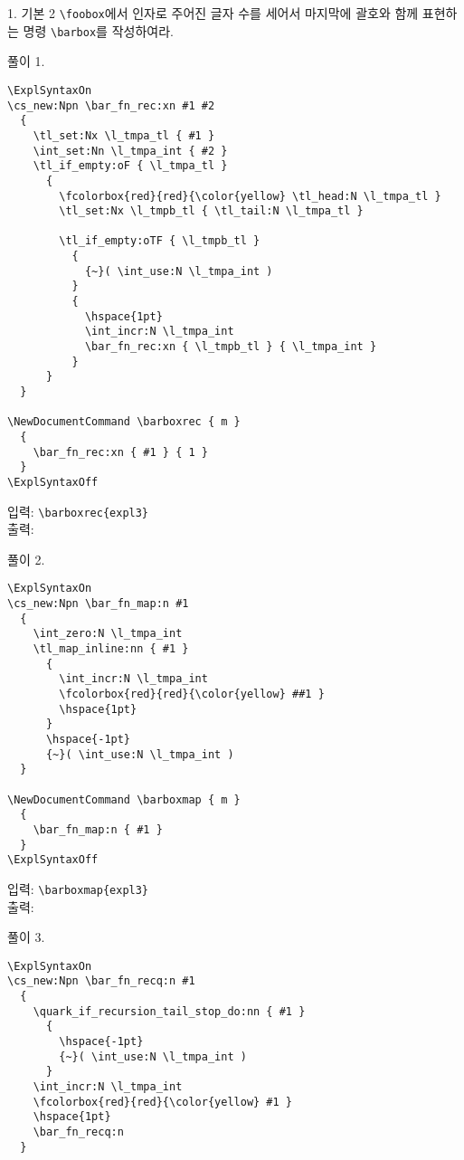 \documentclass[a4paper,amsmath,itemph]{oblivoir}
\begin{document}
\begin{questionp}{1. 기본 2}
  \verb|\foobox|에서 인자로 주어진 글자 수를 세어서 마지막에 괄호와 함께
  표현하는 명령 \verb|\barbox|를 작성하여라.

  \tcblower

  풀이 1.
  \begin{verbatim}
\ExplSyntaxOn
\cs_new:Npn \bar_fn_rec:xn #1 #2
  {
    \tl_set:Nx \l_tmpa_tl { #1 }
    \int_set:Nn \l_tmpa_int { #2 }
    \tl_if_empty:oF { \l_tmpa_tl }
      {
        \fcolorbox{red}{red}{\color{yellow} \tl_head:N \l_tmpa_tl }
        \tl_set:Nx \l_tmpb_tl { \tl_tail:N \l_tmpa_tl }

        \tl_if_empty:oTF { \l_tmpb_tl }
          {
            {~}( \int_use:N \l_tmpa_int )
          }
          {
            \hspace{1pt}
            \int_incr:N \l_tmpa_int
            \bar_fn_rec:xn { \l_tmpb_tl } { \l_tmpa_int }
          }
      }
  }

\NewDocumentCommand \barboxrec { m }
  {
    \bar_fn_rec:xn { #1 } { 1 }
  }
\ExplSyntaxOff
  \end{verbatim}

  \begin{tcolorbox}{}
    입력: \verb|\barboxrec{expl3}|\\
    출력: 
  \end{tcolorbox}

  풀이 2.
  \begin{verbatim}
\ExplSyntaxOn
\cs_new:Npn \bar_fn_map:n #1
  {
    \int_zero:N \l_tmpa_int
    \tl_map_inline:nn { #1 }
      {
        \int_incr:N \l_tmpa_int
        \fcolorbox{red}{red}{\color{yellow} ##1 }
        \hspace{1pt}
      }
      \hspace{-1pt}
      {~}( \int_use:N \l_tmpa_int )
  }

\NewDocumentCommand \barboxmap { m }
  {
    \bar_fn_map:n { #1 }
  }
\ExplSyntaxOff
  \end{verbatim}

  \begin{tcolorbox}{}
    입력: \verb|\barboxmap{expl3}|\\
    출력: 
  \end{tcolorbox}

  풀이 3.
  \begin{verbatim}
\ExplSyntaxOn
\cs_new:Npn \bar_fn_recq:n #1
  {
    \quark_if_recursion_tail_stop_do:nn { #1 }
      {
        \hspace{-1pt}
        {~}( \int_use:N \l_tmpa_int )
      }
    \int_incr:N \l_tmpa_int
    \fcolorbox{red}{red}{\color{yellow} #1 }
    \hspace{1pt}
    \bar_fn_recq:n
  }


\end{verbatim}
\end{questionp}
\end{document}

